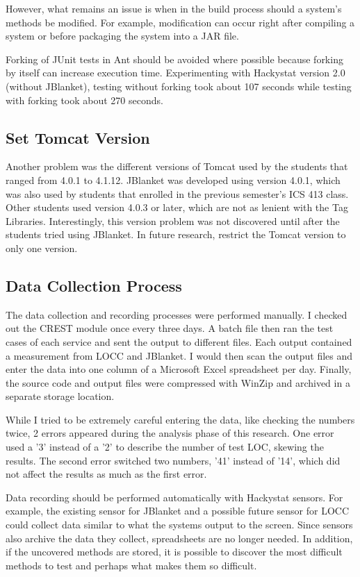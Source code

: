 However, what remains an issue is when in the build process should a
system's methods be modified.  For example, modification can occur right
after compiling a system or before packaging the system into a JAR file.

Forking of JUnit tests in Ant should be avoided where possible because
forking by itself can increase execution time.  Experimenting with
Hackystat version 2.0 (without JBlanket), testing without forking took
about 107 seconds while testing with forking took about 270 seconds.

\subsection{Set Tomcat Version}

Another problem was the different versions of Tomcat used by the students
that ranged from 4.0.1 to 4.1.12.  JBlanket was developed using version
4.0.1, which was also used by students that enrolled in the previous
semester's ICS 413 class.  Other students used version 4.0.3 or later,
which are not as lenient with the Tag Libraries.  Interestingly, this
version problem was not discovered until after the students tried using
JBlanket.  In future research, restrict the Tomcat version to only one
version.

\subsection{Data Collection Process}
The data collection and recording processes were performed manually.  I
checked out the CREST module once every three days.  A batch file then ran
the test cases of each service and sent the output to different files.
Each output contained a measurement from LOCC and JBlanket.  I would then
scan the output files and enter the data into one column of a Microsoft
Excel spreadsheet per day.  Finally, the source code and output files were
compressed with WinZip \cite{WinZip} and archived in a separate storage
location.

While I tried to be extremely careful entering the data, like checking the
numbers twice, 2 errors appeared during the analysis phase of this
research.  One error used a '3' instead of a '2' to describe the number of
test LOC, skewing the results.  The second error switched two numbers, '41'
instead of '14', which did not affect the results as much as the first
error.

Data recording should be performed automatically with Hackystat sensors.
For example, the existing sensor for JBlanket and a possible future sensor
for LOCC could collect data similar to what the systems output to the
screen.  Since sensors also archive the data they collect, spreadsheets are
no longer needed.  In addition, if the uncovered methods are stored, it is
possible to discover the most difficult methods to test and perhaps what
makes them so difficult.

